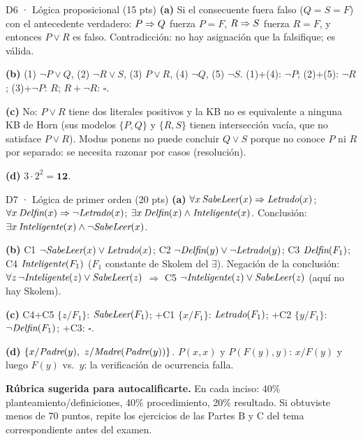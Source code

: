 \begin{solucion}{D6 · Lógica proposicional (15 pts)}
\textbf{(a)} Si el consecuente fuera falso ($Q=S=F$) con el antecedente verdadero: $P\Rightarrow Q$ fuerza $P=F$,
$R\Rightarrow S$ fuerza $R=F$, y entonces $P\vee R$ es falso. Contradicción: no hay asignación que la falsifique; es válida.

\textbf{(b)} (1) $\neg P\vee Q$, (2) $\neg R\vee S$, (3) $P\vee R$, (4) $\neg Q$, (5) $\neg S$.
(1)+(4): $\neg P$; (2)+(5): $\neg R$; (3)+$\neg P$: $R$; $R+\neg R$: $\square$.

\textbf{(c)} No: $P\vee R$ tiene dos literales positivos y la KB no es equivalente a ninguna KB de Horn
(sus modelos $\{P,Q\}$ y $\{R,S\}$ tienen intersección vacía, que no satisface $P\vee R$). Modus ponens no
puede concluir $Q\vee S$ porque no conoce $P$ ni $R$ por separado: se necesita razonar por casos
(resolución).

\textbf{(d)} $3\cdot2^2=\mathbf{12}$.
\end{solucion}

\begin{solucion}{D7 · Lógica de primer orden (20 pts)}
\textbf{(a)} $\forall x\,\textit{SabeLeer}(x)\Rightarrow\textit{Letrado}(x)$; $\forall x\,\textit{Delfin}(x)\Rightarrow\neg\textit{Letrado}(x)$;
$\exists x\,\textit{Delfin}(x)\wedge\textit{Inteligente}(x)$. Conclusión: $\exists x\,\textit{Inteligente}(x)\wedge\neg\textit{SabeLeer}(x)$.

\textbf{(b)} C1 $\neg\textit{SabeLeer}(x)\vee\textit{Letrado}(x)$; C2 $\neg\textit{Delfin}(y)\vee\neg\textit{Letrado}(y)$;
C3 $\textit{Delfin}(F_1)$; C4 $\textit{Inteligente}(F_1)$ ($F_1$ constante de Skolem del $\exists$). Negación de la conclusión:
$\forall z\,\neg\textit{Inteligente}(z)\vee\textit{SabeLeer}(z)$ $\Rightarrow$ C5 $\neg\textit{Inteligente}(z)\vee\textit{SabeLeer}(z)$ (aquí no hay Skolem).

\textbf{(c)} C4+C5 $\{z/F_1\}$: $\textit{SabeLeer}(F_1)$; +C1 $\{x/F_1\}$: $\textit{Letrado}(F_1)$; +C2 $\{y/F_1\}$: $\neg\textit{Delfin}(F_1)$;
+C3: $\square$.

\textbf{(d)} $\{x/\p{Padre}(y),\ z/\p{Madre}(\p{Padre}(y))\}$. $P(x,x)$ y $P(F(y),y)$: $x/F(y)$ y luego $F(y)$ vs.\ $y$:
la verificación de ocurrencia falla.
\end{solucion}

\begin{nota}
\textbf{Rúbrica sugerida para autocalificarte.} En cada inciso: 40\% planteamiento/definiciones,
40\% procedimiento, 20\% resultado. Si obtuviste menos de 70 puntos, repite los ejercicios de las
Partes B y C del tema correspondiente antes del examen.
\end{nota}


